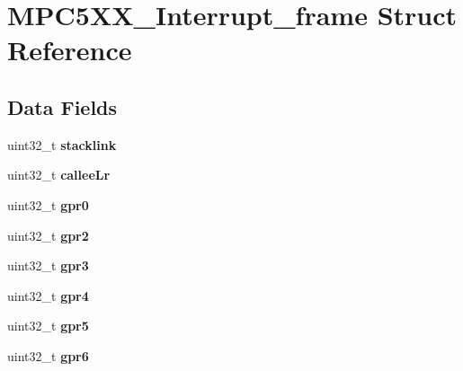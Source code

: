 \hypertarget{structMPC5XX__Interrupt__frame}{}\section{M\+P\+C5\+X\+X\+\_\+\+Interrupt\+\_\+frame Struct Reference}
\label{structMPC5XX__Interrupt__frame}
\subsection*{Data Fields}
\begin{DoxyCompactItemize}
\item 
\mbox{\label{structMPC5XX__Interrupt__frame_a55ed799bf1d03739fb9e8c84bfa75c97}} 
uint32\+\_\+t {\bfseries stacklink}
\item 
\mbox{\label{structMPC5XX__Interrupt__frame_a55230f838d5c308c882226e0f1a27600}} 
uint32\+\_\+t {\bfseries callee\+Lr}
\item 
\mbox{\label{structMPC5XX__Interrupt__frame_a18a06a64ac13cd748add3ed5e50749f8}} 
uint32\+\_\+t {\bfseries gpr0}
\item 
\mbox{\label{structMPC5XX__Interrupt__frame_a771fdf9981ec642ea3ade8bfc4cc8107}} 
uint32\+\_\+t {\bfseries gpr2}
\item 
\mbox{\label{structMPC5XX__Interrupt__frame_adb5c4861df80772914852b18a5bc61c7}} 
uint32\+\_\+t {\bfseries gpr3}
\item 
\mbox{\label{structMPC5XX__Interrupt__frame_a89b505989336758f9ca3fa0c4e206b22}} 
uint32\+\_\+t {\bfseries gpr4}
\item 
\mbox{\label{structMPC5XX__Interrupt__frame_aca28c749c01cfc61ac27892bd9e53746}} 
uint32\+\_\+t {\bfseries gpr5}
\item 
\mbox{\label{structMPC5XX__Interrupt__frame_a3fcd1cc41c5b08a7c408d3a7c3c1282f}} 
uint32\+\_\+t {\bfseries gpr6}
\item 
\mbox{\label{structMPC5XX__Interrupt__frame_a2caadf6fde9135af1130ece8f9690299}} 

\end{DoxyCompactItemize}
